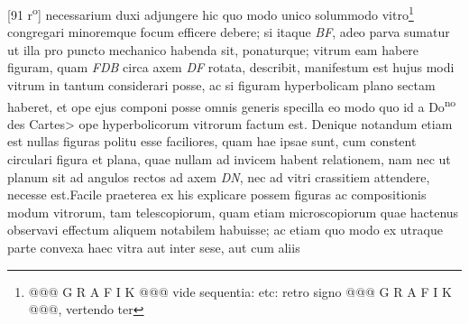 [91 r\textsuperscript{o}]  necessarium duxi adjungere hic quo modo unico solummodo vitro\footnote{@@@ G R A F I K @@@ vide sequentia:  etc: retro signo @@@ G R A F I K @@@, vertendo ter}  congregari minoremque focum efficere debere; si itaque \textit{BF},  adeo parva sumatur ut illa pro puncto mechanico\protect{} habenda  sit, ponaturque; vitrum eam habere figuram, quam \textit{FDB}  circa axem \textit{DF} rotata, describit, manifestum est hujus  modi vitrum in tantum considerari posse, ac si figuram  hyperbolicam plano sectam haberet, et ope ejus componi  posse omnis generis specilla\protect{} eo modo quo id a Do\textsuperscript{no} des Cartes>\protect{} ope hyperbolicorum vitrorum factum est. Denique  notandum etiam est nullas figuras politu esse faciliores,  quam hae ipsae sunt, cum constent circulari figura et plana,  quae nullam ad invicem habent relationem, nam  nec ut planum sit ad angulos rectos ad axem \textit{DN}, nec  ad vitri crassitiem attendere, necesse est.\pend \pstart  Facile praeterea ex his explicare possem figuras  ac compositionis modum vitrorum, tam telescopiorum\protect{}, quam  etiam microscopiorum\protect{} quae hactenus observavi effectum  aliquem notabilem habuisse; ac etiam quo modo ex utraque  parte convexa haec vitra aut inter sese, aut cum aliis 